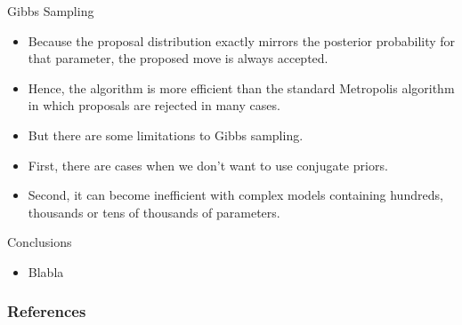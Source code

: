 \documentclass[handout]{beamer}
\begin{document}
\begin{frame}{Gibbs Sampling}
\scriptsize{

\begin{itemize}

\item Because the proposal distribution exactly mirrors the posterior probability for that parameter, the proposed move is always accepted.

\item Hence, the algorithm is more efficient than the standard Metropolis algorithm in which proposals are rejected in many cases.

\item But there are some limitations to Gibbs sampling.

\item First, there are cases when we don't want to use conjugate priors. 

\item Second, it can become inefficient with complex models containing hundreds, thousands or tens of thousands of parameters.


\end{itemize}


} 
\end{frame}


\begin{frame}{Conclusions}
\scriptsize{

\begin{itemize}
\item Blabla
\end{itemize}


} 
\end{frame}


\begin{frame}[allowframebreaks]\scriptsize
\frametitle{References}


%
\end{frame}  









\end{document}
